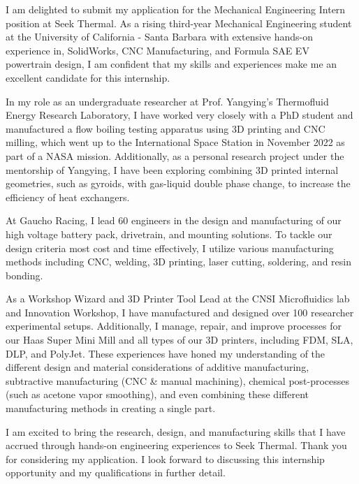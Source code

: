 \documentclass[11pt, letterpaper]{awesome-cv} %
\begin{document}
\makecvheader %

\makelettertitle %


\begin{cvletter}


I am delighted to submit my application for the Mechanical Engineering Intern position at Seek Thermal. As a rising third-year Mechanical Engineering student at the University of California - Santa Barbara with extensive hands-on experience in, SolidWorks, CNC Manufacturing, and Formula SAE EV powertrain design,  I am confident that my skills and experiences make me an excellent candidate for this internship.

In my role as an undergraduate researcher at Prof. Yangying's Thermofluid Energy Research Laboratory, I have worked very closely with a PhD student and manufactured a flow boiling testing apparatus using 3D printing and CNC milling, which went up to the International Space Station in November 2022 as part of a NASA mission. Additionally, as a personal research project under the mentorship of Yangying, I have been exploring combining 3D printed internal geometries, such as gyroids, with gas-liquid double phase change, to increase the efficiency of heat exchangers. 

At Gaucho Racing, I lead 60 engineers in the design and manufacturing of our high voltage battery pack, drivetrain, and mounting solutions. To tackle our design criteria most cost and time effectively, I utilize various manufacturing methods including CNC, welding, 3D printing, laser cutting, soldering, and resin bonding. 

As a Workshop Wizard and 3D Printer Tool Lead at the CNSI Microfluidics lab and Innovation Workshop, I have manufactured and designed over 100 researcher experimental setups. Additionally, I manage, repair, and improve processes for our Haas Super Mini Mill and all types of our 3D printers, including FDM, SLA, DLP, and PolyJet. These experiences have honed my understanding of the different design and material considerations of additive manufacturing, subtractive manufacturing (CNC \& manual machining), chemical post-processes (such as acetone vapor smoothing), and even combining these different manufacturing methods in creating a single part.

I am excited to bring the research, design, and manufacturing skills that I have accrued through hands-on engineering experiences to Seek Thermal. Thank you for considering my application. I look forward to discussing this internship opportunity and my qualifications in further detail.


\end{cvletter}


\makeletterclosing %
\end{document}

